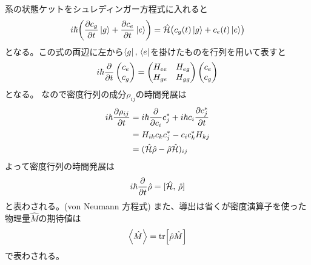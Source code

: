 \documentclass[11pt,dvipdfmx,a4paper]{jsarticle}
\begin{document}
系の状態ケットをシュレディンガー方程式に入れると
\begin{equation}
	i\hbar\qty(\pdv{c_g}{t}\ket{g}+\pdv{c_e}{t}\ket{e}) = \hat{\mathcal{H}}\bigl(c_g (t) \ket{g} + c_e (t) \ket{e}\bigr)
\end{equation}
となる。この式の両辺に左から\(\bra{g},\,\bra{e}\)を掛けたものを行列を用いて表すと
\begin{equation}
	i\hbar\pdv{t}
	\begin{pmatrix}
		c_e\\
		c_g
	\end{pmatrix}
	=
	\begin{pmatrix}
		H_{ee} & H_{eg}\\
		H_{ge} & H_{gg}
	\end{pmatrix}
	\begin{pmatrix}
		c_e\\
		c_g
	\end{pmatrix}
\end{equation}
となる。
なので密度行列の成分\(\rho_{ij}\)の時間発展は
\begin{align}
	i\hbar\pdv{\rho_{ij}}{t} &= i\hbar\pdv{c_i}c_j^*+i\hbar c_i \pdv{c_j^*}{t}\\
	&= H_{ik} c_k c_j^* - c_i c_k^* H_{kj}\\
	&= (\hat{\mathcal{H}}\hat{\rho}-\hat{\rho}\hat{\mathcal{H}})_{ij}
\end{align}
よって密度行列の時間発展は
\begin{equation}
	i\hbar \pdv{t} \hat{\rho} = [\hat{\mathcal{H}},\,\hat{\rho}]
\end{equation}
と表わされる。(von Neumann 方程式)
また、導出は省くが密度演算子を使った物理量\(\hat{M}\)の期待値は
\begin{equation}
	\ev{\hat{M}} = \tr[\hat{\rho}\hat{M}]
\end{equation}
で表わされる。
\end{document}
